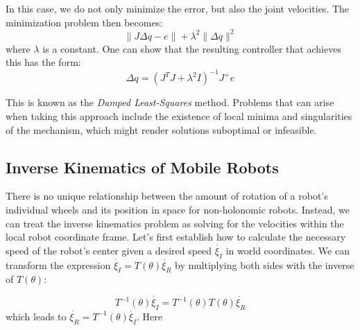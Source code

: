 In this case, we do not only minimize the error, but also the joint velocities. The minimization problem then becomes:
\begin{equation}
\|J\Delta q-e\|+\lambda^2\|\Delta q\|^2
\end{equation}
where $\lambda$ is a constant. One can show that the resulting controller that achieves this has the form:
\begin{equation}
\Delta q=(J^TJ+\lambda^2 I)^{-1}J^+e
\end{equation}

This is known as the \textsl{Damped Least-Squares} method. Problems that can arise when taking this approach include the existence of local minima and singularities of the mechanism, which might render solutions suboptimal or infeasible.

\subsection{Inverse Kinematics of Mobile Robots}\label{sec:kinematics:ik:mobile}

There is no unique relationship between the amount of rotation of a robot's individual wheels and its position in space for non-holonomic robots. Instead, we can treat the inverse kinematics problem as solving for the velocities within the local robot coordinate frame.
%
Let's first establish how to calculate the necessary speed of the robot's center given a desired speed $ \dot{\xi_I}$ in world coordinates. We can transform the expression $ \dot{\xi_I}=T(\theta)\dot{\xi_R}$ by multiplying both sides with the inverse of $ T(\theta)$:

\begin{equation}\label{eq:mbik}
T^{-1}(\theta)\dot{\xi_I}=T^{-1}(\theta)T(\theta)\dot{\xi_R}
\end{equation}
which leads to $ \dot{\xi_R}=T^{-1}(\theta)\dot{\xi_I}$. Here

